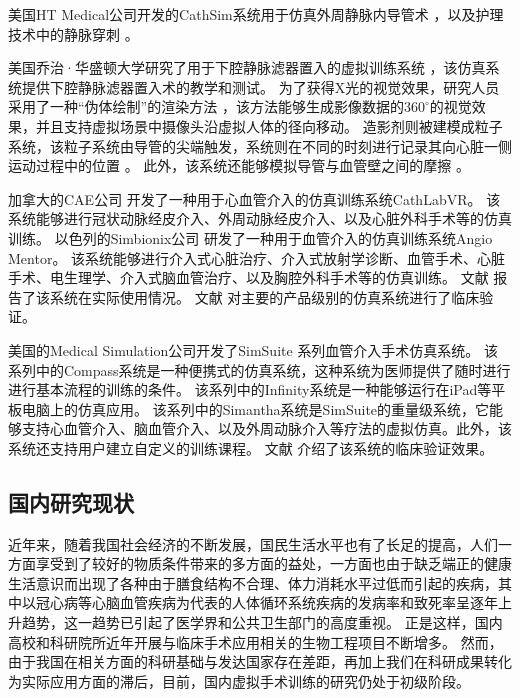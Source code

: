 美国HT Medical公司开发的CathSim系统用于仿真外周静脉内导管术 \cite{ursino1999cathsim}，以及护理技术中的静脉穿刺 \cite{Barker1999CathSim}。

美国乔治·华盛顿大学研究了用于下腔静脉滤器置入的虚拟训练系统 \cite{Hahn1998GWU}，该仿真系统提供下腔静脉滤器置入术的教学和测试。
为了获得X光的视觉效果，研究人员采用了一种“伪体绘制”的渲染方法 \cite{Park1996GWU}，该方法能够生成影像数据的$360^\circ$的视觉效果，并且支持虚拟场景中摄像头沿虚拟人体的径向移动。
造影剂则被建模成粒子系统，该粒子系统由导管的尖端触发，系统则在不同的时刻进行记录其向心脏一侧运动过程中的位置 \cite{Hahn1998GWU}。
此外，该系统还能够模拟导管与血管壁之间的摩擦 \cite{Hahn1998GWU}。

加拿大的CAE公司 \cite{caeweb}开发了一种用于心血管介入的仿真训练系统CathLabVR。
该系统能够进行冠状动脉经皮介入、外周动脉经皮介入、以及心脏外科手术等的仿真训练。
以色列的Simbionix公司 \cite{simbionixweb}研发了一种用于血管介入的仿真训练系统Angio Mentor。
该系统能够进行介入式心脏治疗、介入式放射学诊断、血管手术、心脏手术、电生理学、介入式脑血管治疗、以及胸腔外科手术等的仿真训练。
文献 \cite{hislop2009Simbionix,Lee2012Simbionix}报告了该系统在实际使用情况。
文献 \cite{Petri2013Comparison}对主要的产品级别的仿真系统进行了临床验证。

美国的Medical Simulation公司开发了SimSuite \cite{simsuiteweb}系列血管介入手术仿真系统。
该系列中的Compass系统是一种便携式的仿真系统，这种系统为医师提供了随时进行进行基本流程的训练的条件。
该系列中的Infinity系统是一种能够运行在iPad等平板电脑上的仿真应用。
该系列中的Simantha系统是SimSuite的重量级系统，它能够支持心血管介入、脑血管介入、以及外周动脉介入等疗法的虚拟仿真。此外，该系统还支持用户建立自定义的训练课程。
文献 \cite{Dawson2007SimSuite}介绍了该系统的临床验证效果。

\subsection{国内研究现状}
\label{sec1-4-2}

近年来，随着我国社会经济的不断发展，国民生活水平也有了长足的提高，人们一方面享受到了较好的物质条件带来的多方面的益处，一方面也由于缺乏端正的健康生活意识而出现了各种由于膳食结构不合理、体力消耗水平过低而引起的疾病，其中以冠心病等心脑血管疾病为代表的人体循环系统疾病的发病率和致死率呈逐年上升趋势，这一趋势已引起了医学界和公共卫生部门的高度重视。
正是这样，国内高校和科研院所近年开展与临床手术应用相关的生物工程项目不断增多。
然而，由于我国在相关方面的科研基础与发达国家存在差距，再加上我们在科研成果转化为实际应用方面的滞后，目前，国内虚拟手术训练的研究仍处于初级阶段。

